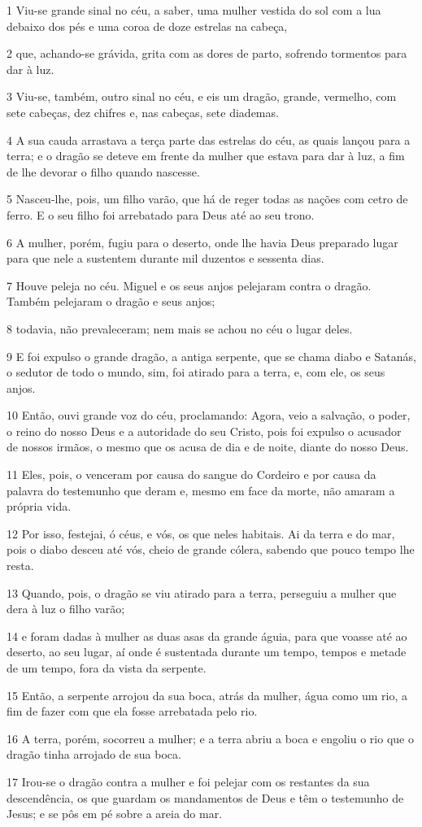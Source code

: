\par 1 Viu-se grande sinal no céu, a saber, uma mulher vestida do sol com a lua debaixo dos pés e uma coroa de doze estrelas na cabeça,
\par 2 que, achando-se grávida, grita com as dores de parto, sofrendo tormentos para dar à luz.
\par 3 Viu-se, também, outro sinal no céu, e eis um dragão, grande, vermelho, com sete cabeças, dez chifres e, nas cabeças, sete diademas.
\par 4 A sua cauda arrastava a terça parte das estrelas do céu, as quais lançou para a terra; e o dragão se deteve em frente da mulher que estava para dar à luz, a fim de lhe devorar o filho quando nascesse.
\par 5 Nasceu-lhe, pois, um filho varão, que há de reger todas as nações com cetro de ferro. E o seu filho foi arrebatado para Deus até ao seu trono.
\par 6 A mulher, porém, fugiu para o deserto, onde lhe havia Deus preparado lugar para que nele a sustentem durante mil duzentos e sessenta dias.
\par 7 Houve peleja no céu. Miguel e os seus anjos pelejaram contra o dragão. Também pelejaram o dragão e seus anjos;
\par 8 todavia, não prevaleceram; nem mais se achou no céu o lugar deles.
\par 9 E foi expulso o grande dragão, a antiga serpente, que se chama diabo e Satanás, o sedutor de todo o mundo, sim, foi atirado para a terra, e, com ele, os seus anjos.
\par 10 Então, ouvi grande voz do céu, proclamando: Agora, veio a salvação, o poder, o reino do nosso Deus e a autoridade do seu Cristo, pois foi expulso o acusador de nossos irmãos, o mesmo que os acusa de dia e de noite, diante do nosso Deus.
\par 11 Eles, pois, o venceram por causa do sangue do Cordeiro e por causa da palavra do testemunho que deram e, mesmo em face da morte, não amaram a própria vida.
\par 12 Por isso, festejai, ó céus, e vós, os que neles habitais. Ai da terra e do mar, pois o diabo desceu até vós, cheio de grande cólera, sabendo que pouco tempo lhe resta.
\par 13 Quando, pois, o dragão se viu atirado para a terra, perseguiu a mulher que dera à luz o filho varão;
\par 14 e foram dadas à mulher as duas asas da grande águia, para que voasse até ao deserto, ao seu lugar, aí onde é sustentada durante um tempo, tempos e metade de um tempo, fora da vista da serpente.
\par 15 Então, a serpente arrojou da sua boca, atrás da mulher, água como um rio, a fim de fazer com que ela fosse arrebatada pelo rio.
\par 16 A terra, porém, socorreu a mulher; e a terra abriu a boca e engoliu o rio que o dragão tinha arrojado de sua boca.
\par 17 Irou-se o dragão contra a mulher e foi pelejar com os restantes da sua descendência, os que guardam os mandamentos de Deus e têm o testemunho de Jesus; e se pôs em pé sobre a areia do mar.

